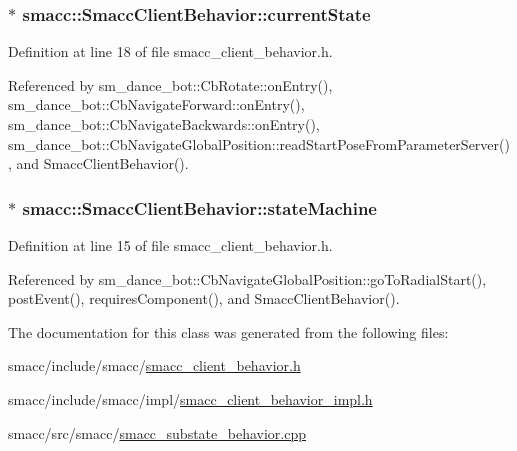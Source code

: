 \subsubsection[{\texorpdfstring{current\+State}{currentState}}]{$\ast$ smacc\+::\+Smacc\+Client\+Behavior\+::current\+State}\hypertarget{classsmacc_1_1SmaccClientBehavior_af76fc9b877542ed5caf033f820c107d0}{}\label{classsmacc_1_1SmaccClientBehavior_af76fc9b877542ed5caf033f820c107d0}


Definition at line 18 of file smacc\+\_\+client\+\_\+behavior.\+h.



Referenced by sm\+\_\+dance\+\_\+bot\+::\+Cb\+Rotate\+::on\+Entry(), sm\+\_\+dance\+\_\+bot\+::\+Cb\+Navigate\+Forward\+::on\+Entry(), sm\+\_\+dance\+\_\+bot\+::\+Cb\+Navigate\+Backwards\+::on\+Entry(), sm\+\_\+dance\+\_\+bot\+::\+Cb\+Navigate\+Global\+Position\+::read\+Start\+Pose\+From\+Parameter\+Server(), and Smacc\+Client\+Behavior().

\subsubsection[{\texorpdfstring{state\+Machine}{stateMachine}}]{$\ast$ smacc\+::\+Smacc\+Client\+Behavior\+::state\+Machine}\hypertarget{classsmacc_1_1SmaccClientBehavior_aa1c28c177d50a471c88c6a577cd6077e}{}\label{classsmacc_1_1SmaccClientBehavior_aa1c28c177d50a471c88c6a577cd6077e}


Definition at line 15 of file smacc\+\_\+client\+\_\+behavior.\+h.



Referenced by sm\+\_\+dance\+\_\+bot\+::\+Cb\+Navigate\+Global\+Position\+::go\+To\+Radial\+Start(), post\+Event(), requires\+Component(), and Smacc\+Client\+Behavior().



The documentation for this class was generated from the following files\+:\begin{DoxyCompactItemize}
\item 
smacc/include/smacc/\hyperlink{smacc__client__behavior_8h}{smacc\+\_\+client\+\_\+behavior.\+h}\item 
smacc/include/smacc/impl/\hyperlink{smacc__client__behavior__impl_8h}{smacc\+\_\+client\+\_\+behavior\+\_\+impl.\+h}\item 
smacc/src/smacc/\hyperlink{smacc__substate__behavior_8cpp}{smacc\+\_\+substate\+\_\+behavior.\+cpp}\end{DoxyCompactItemize}
